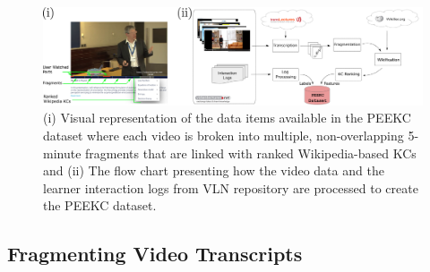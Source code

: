 \documentclass[letterpaper]{article} %
\begin{document}

\begin{figure}[ht]
\begin{center}
    \centerline{\includegraphics[width=.9\linewidth]{peek_data_pipe.pdf}}
    \caption{(i) Visual representation of the data items available in the PEEKC dataset where each video is broken into multiple, non-overlapping 5-minute fragments that are linked with ranked Wikipedia-based KCs and (ii) The flow chart presenting how the video data and the learner interaction logs from VLN repository are processed to create the PEEKC dataset.}
    \label{fig:peek_pipe}
\end{center}
\end{figure}


\subsection{Fragmenting Video Transcripts}
\end{document}
